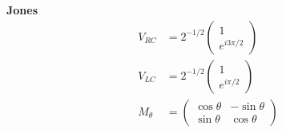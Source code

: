 \documentclass[12pt]{article}
\begin{document}
\begin{multicols}{3}
\textbf{Jones}
\begin{align}
  V_{RC} &= 2^{-1/2} \begin{pmatrix}1\\e^{i3\pi/2}\end{pmatrix}\\
  V_{LC} &= 2^{-1/2} \begin{pmatrix}1\\e^{i\pi/2}\end{pmatrix}\\
  M_{\theta} &= \begin{pmatrix}
    \cos\theta & -\sin\theta\\
    \sin\theta & \cos\theta
  \end{pmatrix}
\end{align}

\end{multicols}
\end{document}
